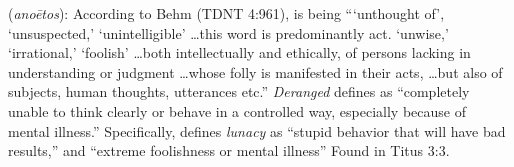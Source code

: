 \item[Lunacy,]

(\textit{anoētos}):
According to Behm (TDNT 4:961), is being ```unthought of', `unsuspected,' `unintelligible' \ldots this word is predominantly act. `unwise,' `irrational,' `foolish' \ldots both intellectually and ethically, of persons lacking in understanding or judgment \ldots whose folly is manifested in their acts, \ldots but also of subjects, human thoughts, utterances etc.'' 
\emph{Deranged} defines as ``completely unable to think clearly or behave in a controlled way, especially because of mental illness.'' Specifically, defines \emph{lunacy} as ``stupid behavior that will have bad results,'' and ``extreme foolishness or mental illness''
Found in Titus 3:3.
